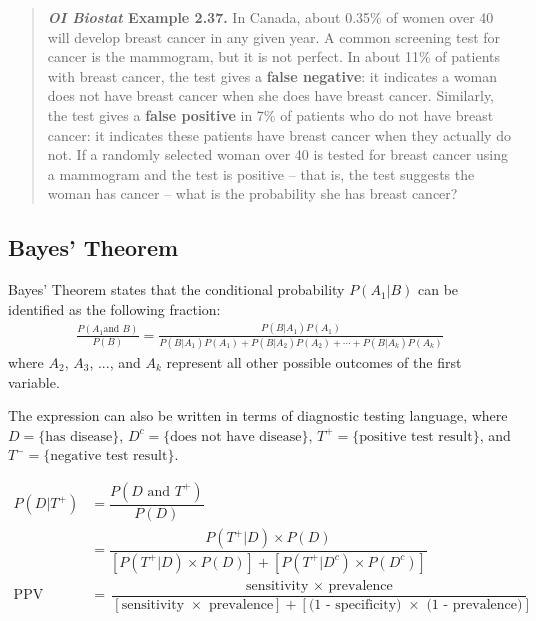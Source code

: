 \documentclass{report}\usepackage[]{graphicx}\usepackage[]{color}
\begin{document}
\begin{quotation}

\textbf{\textit{OI Biostat} Example 2.37.} In Canada, about 0.35\% of women over 40 will develop breast cancer in any given year. A common screening test for cancer is the mammogram, but it is not perfect. In about 11\% of patients with breast cancer, the test gives a \textbf{false negative}: it indicates a woman does not have breast cancer when she does have breast cancer. Similarly, the test gives a \textbf{false positive} in 7\% of patients who do not have breast cancer: it indicates these patients have breast cancer when they actually do not. If a randomly selected woman over 40 is tested for breast cancer using a mammogram and the test is positive -- that is, the test suggests the woman has cancer -- what is the probability she has breast cancer?

\end{quotation}

\subsection{Bayes' Theorem}

Bayes' Theorem states that the conditional probability $P(A_1 | B)$ can be identified as the following fraction:\vspace{-1.5mm}
\begin{align*}
\frac{P(A_1 \text{and } B)}{P(B)}= \frac{P(B | A_1) P(A_1)}
	{P(B | A_1) P(A_1) + P(B | A_2) P(A_2) + \cdots + P(B | A_k) P(A_k)}
\end{align*}
where $A_2$, $A_3$, ..., and $A_k$ represent all other possible outcomes of the first variable.

The expression can also be written in terms of diagnostic testing language, where $D = \text{\{has disease\}}$, $D^c = \text{\{does not have disease\}}$, $T^{+} = \text{\{positive test result\}}$, and $T^{-} = \text{\{negative test result\}}$.

\begin{align*}
P(D|T^{+}) &= \dfrac{P(D \text{ and } T^{+})}{P(D)} \\
&= \dfrac{P(T^{+}|D) \times P(D)}{[P(T^{+}|D) \times P(D)] + [P(T^{+}|D^c) \times P(D^c)]} \\
\text{PPV} &= \dfrac{\text{sensitivity } \times \text{ prevalence}}{[\text{sensitivity } \times \text{ prevalence}] + [\text{(1 - specificity) } \times \text{ (1 - prevalence)}]}
\end{align*}
\end{document}
